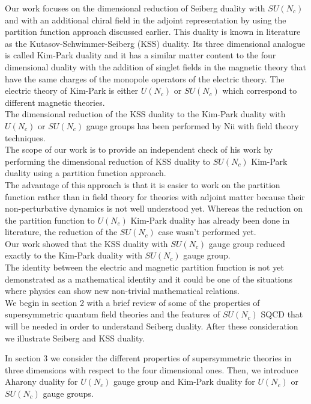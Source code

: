 Our work focuses on the dimensional reduction of Seiberg duality with $SU(N_c)$ and with an additional chiral field in the adjoint representation by using the partition function approach discussed earlier.
This duality is known in literature as the Kutasov-Schwimmer-Seiberg (KSS) duality.
Its three dimensional analogue is called Kim-Park duality and it has a similar matter content to the four dimensional duality with the addition of singlet fields in the magnetic theory that have the same charges of the monopole operators of the electric theory.
The electric theory of Kim-Park is either $U(N_c)$ or $SU(N_c)$ which correspond to different magnetic theories. 
 \\
The dimensional reduction of the KSS duality to the Kim-Park duality with $U(N_c)$ or $SU(N_c)$ gauge groups has been performed by Nii with field theory techniques.\\
The scope of our work is to provide an independent check of his work by performing the dimensional reduction of KSS duality to $SU(N_c)$ Kim-Park duality using a partition function approach.\\
The advantage of this approach is that it is easier to work on the partition function rather than in field theory for theories with adjoint matter because their non-perturbative dynamics is not well understood yet.
Whereas the reduction on the partition function to $U(N_c)$ Kim-Park duality has already been done in literature, the reduction of the $SU(N_c)$ case wasn't performed yet.\\
Our work showed that the KSS duality with $SU(N_c)$ gauge group reduced exactly to the Kim-Park duality with $SU(N_c)$ gauge group.\\
The identity between the electric and magnetic partition function is not yet demonstrated as a mathematical identity and it could be one of the situations where physics can show new non-trivial mathematical relations. 
\\

We begin in section 2 with a brief review of some of the properties of supersymmetric quantum field theories and the features of $SU(N_c)$ SQCD that will be needed in order to understand Seiberg duality.
After these consideration we illustrate Seiberg and KSS duality.

In section 3 we consider the different properties of supersymmetric theories in three dimensions with respect to the four dimensional ones.
Then, we introduce Aharony duality for $U(N_c)$ gauge group and Kim-Park duality for $U(N_c)$ or $SU(N_c)$ gauge groups.


